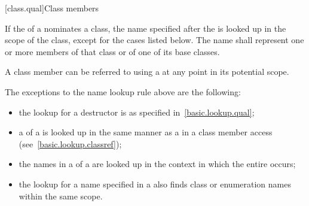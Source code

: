 [class.qual]{Class members}

\pnum
{}%
If the  of a 
nominates a class, the name specified after the
 is looked up in the scope of the
class, except for the cases listed below.
The name shall represent one or more members of that class or of one of
its base classes.
\begin{note}
A class member
can be referred to using a  at any point in its
potential scope.
\end{note}
The exceptions to
the name lookup rule above are the following:
\begin{itemize}
\item the lookup for a destructor is as specified
in~\ref{basic.lookup.qual};

\item a  of a
 is looked up
in the same manner as a  in a class member
access (see~\ref{basic.lookup.classref});

\item the names in a  of a
 are looked up in the context in which the entire
 occurs;

\item the lookup for a name specified in a
 also finds class or
enumeration names  within the same
scope.
\end{itemize}

